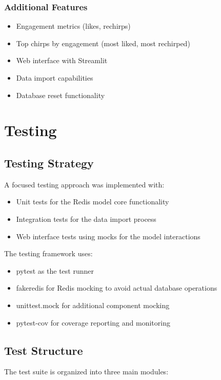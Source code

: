 \documentclass[a4paper,11pt]{article}
\begin{document}
\subsubsection{Additional Features}
\begin{itemize}
    \item Engagement metrics (likes, rechirps)
    \item Top chirps by engagement (most liked, most rechirped)
    \item Web interface with Streamlit
    \item Data import capabilities
    \item Database reset functionality
\end{itemize}

\newpage
\section{Testing}

\subsection{Testing Strategy}
A focused testing approach was implemented with:

\begin{itemize}
    \item Unit tests for the Redis model core functionality
    \item Integration tests for the data import process
    \item Web interface tests using mocks for the model interactions
\end{itemize}

The testing framework uses:

\begin{itemize}
    \item pytest as the test runner
    \item fakeredis for Redis mocking to avoid actual database operations
    \item unittest.mock for additional component mocking
    \item pytest-cov for coverage reporting and monitoring
\end{itemize}

\subsection{Test Structure}
The test suite is organized into three main modules:
\end{document}
